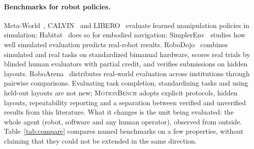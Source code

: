 \documentclass[11pt]{article}
\newcommand{\mb}{\textsc{MotionBench}}
\begin{document}
\paragraph{Benchmarks for robot policies.} Meta-World~\cite{metaworld2019}, CALVIN~\cite{calvin2022}
and LIBERO~\cite{libero2023} evaluate learned manipulation policies in simulation;
Habitat~\cite{habitat2019} does so for embodied navigation; SimplerEnv~\cite{simplerenv2024} studies
how well simulated evaluation predicts real-robot results. RoboDojo~\cite{robodojo2026} combines
simulated and real tasks on standardized bimanual hardware, scores real trials by blinded human
evaluators with partial credit, and verifies submissions on hidden layouts.
RoboArena~\cite{roboarena2025} distributes real-world evaluation across institutions through pairwise
comparisons. Evaluating task completion, standardizing tasks and using held-out layouts are not new;
\mb{} adopts explicit protocols, hidden layouts, repeatability reporting and a separation between
verified and unverified results from this literature. What it changes is the unit being evaluated:
the whole agent (robot, software and any human operator), observed from outside.
Table~\ref{tab:compare} compares named benchmarks on a few properties, without claiming that
they could not be extended in the same direction.
\end{document}

